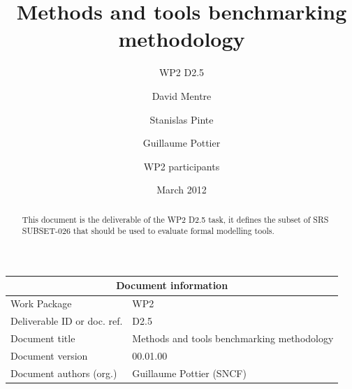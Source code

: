 \documentclass{template/openetcs_report}
\begin{document}
\frontmatter
{}




\title{Methods and tools benchmarking methodology}

\subtitle{WP2 D2.5}

\date{March 2012}


\author{David Mentre}


\author{Stanislas Pinte}


\author{Guillaume Pottier}


\author{WP2 participants}





\begin{abstract}
This document is the deliverable of the WP2 D2.5 task, it defines the subset of SRS SUBSET-026 that should be used
to evaluate formal modelling tools.
\end{abstract}


\maketitle

\begin{tabular}{|p{4.4cm}|p{8.7cm}|}
\hline
\multicolumn{2}{|c|}{Document information} \\
\hline
Work Package &  WP2  \\
Deliverable ID or doc. ref. & D2.5\\
\hline
Document title & Methods and tools benchmarking methodology \\
Document version & 00.01.00 \\
Document authors (org.)  & Guillaume Pottier (SNCF) \\
\hline
\end{tabular}
\end{document}

